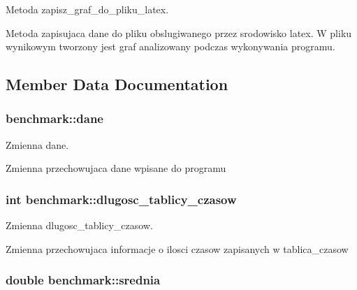 Metoda zapisz\+\_\+graf\+\_\+do\+\_\+pliku\+\_\+latex. 

Metoda zapisujaca dane do pliku obslugiwanego przez srodowisko latex. W pliku wynikowym tworzony jest graf analizowany podczas wykonywania programu. 

\subsection{Member Data Documentation}
\hypertarget{classbenchmark_a300d21139d46ca60159c0105bb2504e9}{
\subsubsection[{dane}]{ benchmark\+::dane\hspace{0.3cm}{\ttfamily [private]}}}\label{classbenchmark_a300d21139d46ca60159c0105bb2504e9}


Zmienna dane. 

Zmienna przechowujaca dane wpisane do programu \hypertarget{classbenchmark_a7f50be921f00a618f498c7b78fee9bde}{
\subsubsection[{dlugosc\+\_\+tablicy\+\_\+czasow}]{\setlength{\rightskip}{0pt plus 5cm}int benchmark\+::dlugosc\+\_\+tablicy\+\_\+czasow\hspace{0.3cm}{\ttfamily [private]}}}\label{classbenchmark_a7f50be921f00a618f498c7b78fee9bde}


Zmienna dlugosc\+\_\+tablicy\+\_\+czasow. 

Zmienna przechowujaca informacje o ilosci czasow zapisanych w tablica\+\_\+czasow \hypertarget{classbenchmark_a94d0b225401072e80f8e29d1bb5beb1d}{
\subsubsection[{srednia}]{\setlength{\rightskip}{0pt plus 5cm}double benchmark\+::srednia\hspace{0.3cm}{\ttfamily [private]}}}\label{classbenchmark_a94d0b225401072e80f8e29d1bb5beb1d}


